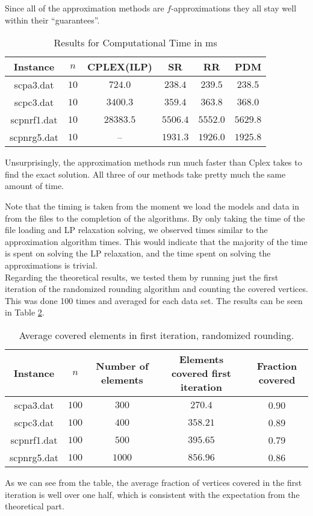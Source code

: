 \documentclass[11pt,a4paper,english]{article}
\begin{document}
Since all of the approximation methods are $f$-approximations \citep[pp. 118-131]{Vaz} they all stay well within their ``guarantees''.

\begin{table}[h!]
  \centering
  \begin{tabular}{|c|c|c|c|c|c|}\hline
    Instance& $n$& CPLEX(ILP)&SR&RR&PDM \\\hline
    scpa3.dat &$10$&$724.0$ & $238.4$& $239.5$ & $238.5$  \\
    scpc3.dat &$10$ & $3400.3$ & $359.4$& $363.8$ & $368.0$ \\
    scpnrf1.dat	 &$10$ & $28383.5$ & $5506.4$& $5552.0$ & $5629.8$  \\
    scpnrg5.dat &$10$ & -- & $1931.3$& $1926.0$ & $1925.8$  \\\hline
  \end{tabular}
  \caption{Results for Computational Time in ms}
  \label{tab:time}
\end{table}

 Unsurprisingly, the approximation methods run much faster than Cplex takes to find the exact solution. All three of our methods take pretty much the same amount of time.

 Note that the timing is taken from the moment we load the models and data in from the files to the completion of the algorithms. By only taking the time of the file loading and LP relaxation solving, we observed times similar to the approximation algorithm times. This would indicate that the majority of the time is spent on solving the LP relaxation, and the time spent on solving the approximations is trivial.\\

Regarding the theoretical results, we tested them by running just the first iteration of the randomized rounding algorithm and counting the covered vertices. This was done 100 times and averaged for each data set. The results can be seen in Table \ref{tab:rand}.

\begin{table}[h!]
  \centering
  \begin{tabular}{|c|c|c|c|c|}\hline
    Instance& $n$ & Number of elements & Elements covered first iteration & Fraction covered\\\hline
    scpa3.dat &$100$    & $300$ & $270.4$ & 0.90 \\
    scpc3.dat &$100$    & $400$ & $358.21$ & 0.89\\
    scpnrf1.dat	 &$100$ & $500$ & $395.65$ & 0.79 \\
    scpnrg5.dat &$100$  & $1000$ & $856.96$ & 0.86 \\\hline
  \end{tabular}
  \caption{Average covered elements in first iteration, randomized rounding.}
  \label{tab:rand}
\end{table}

As we can see from the table, the average fraction of vertices covered in the first iteration is well over one half, which is consistent with the expectation from the theoretical part.

\clearpage


\end{document}
